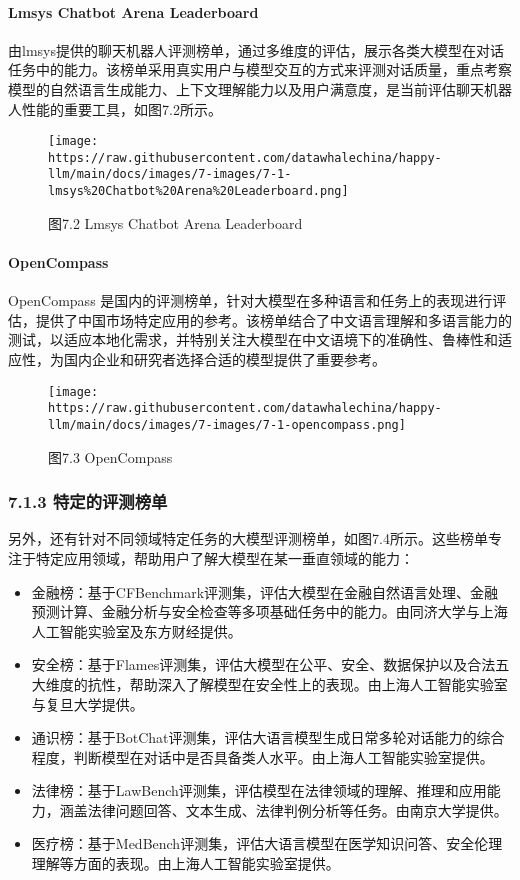 \documentclass[
]{article}
\begin{document}
\paragraph{Lmsys Chatbot Arena
Leaderboard}\label{lmsys-chatbot-arena-leaderboard}

由lmsys提供的聊天机器人评测榜单，通过多维度的评估，展示各类大模型在对话任务中的能力。该榜单采用真实用户与模型交互的方式来评测对话质量，重点考察模型的自然语言生成能力、上下文理解能力以及用户满意度，是当前评估聊天机器人性能的重要工具，如图7.2所示。

\begin{figure}[htbp]\centering
\texttt{[image: https://raw.githubusercontent.com/datawhalechina/happy-llm/main/docs/images/7-images/7-1-lmsys\%20Chatbot\%20Arena\%20Leaderboard.png]}
\caption{图7.2 Lmsys Chatbot Arena Leaderboard}
\end{figure}

\paragraph{OpenCompass}\label{opencompass}

OpenCompass
是国内的评测榜单，针对大模型在多种语言和任务上的表现进行评估，提供了中国市场特定应用的参考。该榜单结合了中文语言理解和多语言能力的测试，以适应本地化需求，并特别关注大模型在中文语境下的准确性、鲁棒性和适应性，为国内企业和研究者选择合适的模型提供了重要参考。

\begin{figure}[htbp]\centering
\texttt{[image: https://raw.githubusercontent.com/datawhalechina/happy-llm/main/docs/images/7-images/7-1-opencompass.png]}
\caption{图7.3 OpenCompass}
\end{figure}

\subsubsection{7.1.3
特定的评测榜单}\label{ux7279ux5b9aux7684ux8bc4ux6d4bux699cux5355}

另外，还有针对不同领域特定任务的大模型评测榜单，如图7.4所示。这些榜单专注于特定应用领域，帮助用户了解大模型在某一垂直领域的能力：

\begin{itemize}
\item
  金融榜：基于CFBenchmark评测集，评估大模型在金融自然语言处理、金融预测计算、金融分析与安全检查等多项基础任务中的能力。由同济大学与上海人工智能实验室及东方财经提供。
\item
  安全榜：基于Flames评测集，评估大模型在公平、安全、数据保护以及合法五大维度的抗性，帮助深入了解模型在安全性上的表现。由上海人工智能实验室与复旦大学提供。
\item
  通识榜：基于BotChat评测集，评估大语言模型生成日常多轮对话能力的综合程度，判断模型在对话中是否具备类人水平。由上海人工智能实验室提供。
\item
  法律榜：基于LawBench评测集，评估模型在法律领域的理解、推理和应用能力，涵盖法律问题回答、文本生成、法律判例分析等任务。由南京大学提供。
\item
  医疗榜：基于MedBench评测集，评估大语言模型在医学知识问答、安全伦理理解等方面的表现。由上海人工智能实验室提供。
\end{itemize}
\end{document}
